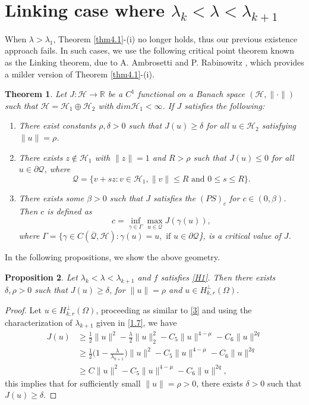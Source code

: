 \documentclass[11pt]{amsart}
\numberwithin{equation}{section}
\newtheorem{thm}{Theorem}[section]
\newtheorem{prop}[thm]{Proposition}
\newcommand{\1}{\frac{1}{2}}
\begin{document}
	\section{Linking case where $\lambda_k < \lambda < \lambda_{k+1}$}
	\label{sec5}
	When $\lambda>\lambda_1$, Theorem \ref{thm4.1}-(i) no longer holds, thus our previous existence approach fails. In such cases, we use the following critical point theorem known as the Linking theorem, due to A. Ambrosetti and
	P. Rabinowitz \cite{Ambrosetti}, which provides a milder version of Theorem \ref{thm4.1}-(i).
	\begin{thm}
		\label{thm5.1}
		Let $J:\mathcal{H} \rightarrow \mathbb{R}$ be a $C^1$ functional on a Banach space $(\mathcal{H}, \|\cdot\|)$ such that $\mathcal{H}=\mathcal{H}_1\oplus \mathcal{H}_2$ with $dim \mathcal{H}_1 < \infty$. If $J$ satisfies the following:
		\begin{enumerate}
			\item [(i)] There exist constants $\rho, \delta >0$ such that $J(u) \geq \delta$ for all $u\in \mathcal{H}_2$ satisfying $\|u\|=\rho$.
			\item [(ii)] There exists $z \notin \mathcal{H}_1$ with $\|z\|=1$ and $R>\rho$ such that $J(u) \leq 0$ for all $u \in \partial \mathcal Q$, where 
			\[ \mathcal Q =\{ v+sz : v \in \mathcal{H}_1, \|v\|\leq R \text{ and } 0 \leq s \leq R\}.\]
			\item [(iii)] There exists some $\beta>0$ such that $J$ satisfies the $(PS)_c$ for $c\in (0,\beta)$.
			Then $c$ is defined as 
			\[ c= \inf_{\gamma\in \Gamma} \max_{u\in \mathcal Q} J(\gamma(u)), \]
			where $\Gamma = \{ \gamma \in C(\overline{\mathcal Q}, \mathcal{H}): \gamma(u)=u, \text{ if } u \in \partial \mathcal Q$\}, is a critical value of $J$.
		\end{enumerate}
	\end{thm}
	In the following propositions, we show the above geometry.
	\begin{prop}
		\label{prop5.2}
		Let $\lambda_k < \lambda< \lambda_{k+1}$ and $f$ satisfies \eqref{H1}. Then there exists $\delta, \rho >0$ such that $J(u) \geq \delta$, for $\|u\|=\rho$ and $u\in H_{k,r}^\perp(\Omega)$.
	\end{prop}
	\begin{proof}
		Let $u\in H_{k,r}^\perp(\Omega)$, proceeding as similar to \eqref{3} and using the characterization of $\lambda_{k+1}$ given in \eqref{1.7}, we have
		\begin{align}
			J(u) &\geq \frac{1}{2} \|u\|^2 -\frac{\lambda}{2} \|u\|^2_2 -C_5\|u\|^{4-\mu} -C_6 \|u\|^{2q}\nonumber\\
			& \geq \frac{1}{2} \Bigg(1 - \frac{\lambda}{\lambda_{k+1}}\Bigg)\|u\|^2- C_5\|u\|^{4-\mu} -C_6 \|u\|^{2q}\nonumber\\
			& \geq C\|u\|^2- C_5\|u\|^{4-\mu} -C_6 \|u\|^{2q},\nonumber
		\end{align}
		this implies that for sufficiently small $\|u\|=\rho>0$, there exists $\delta>0$ such that $J(u) \geq \delta$.
	\end{proof}
\end{document}
